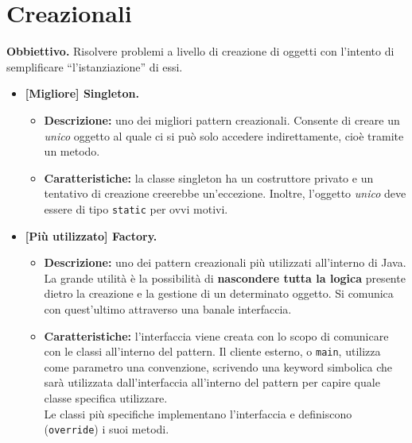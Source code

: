 \documentclass[a4paper,11pt]{article}
\begin{document}
\section{Creazionali}
\textcolor{Mahogany}{\textbf{Obbiettivo.}} Risolvere problemi a livello di creazione di oggetti con l'intento di semplificare ``l'istanziazione'' di essi.
\begin{itemize}
	\item[\ding{42}] \textbf{[Migliore] Singleton.}
		\begin{itemize}
			\item \textbf{Descrizione:} uno dei migliori pattern creazionali. Consente di creare un \emph{unico} oggetto al quale ci si può solo accedere indirettamente, cioè tramite un metodo.
			\item \textbf{Caratteristiche:} la classe singleton ha un costruttore privato e un tentativo di creazione creerebbe un'eccezione. Inoltre, l'oggetto \emph{unico} deve essere di tipo \texttt{static} per ovvi motivi.
		\end{itemize}
	
	\item[\ding{42}]  \textbf{[Più utilizzato] Factory.}
		\begin{itemize}
			\item \textbf{Descrizione:} uno dei pattern creazionali più utilizzati all'interno di Java. La grande utilità è la possibilità di  \textbf{nascondere tutta la logica} presente dietro la creazione e la gestione di un determinato oggetto. Si comunica con quest'ultimo attraverso una banale interfaccia.
			\item \textbf{Caratteristiche:} l'interfaccia viene creata con lo scopo di comunicare con le classi all'interno del pattern. Il cliente esterno, o \texttt{main}, utilizza come parametro una convenzione, scrivendo una keyword simbolica che sarà utilizzata dall'interfaccia all'interno del pattern per capire quale classe specifica utilizzare.\\
			Le classi più specifiche implementano l'interfaccia e definiscono (\texttt{override}) i suoi metodi.
		\end{itemize}
	
\newpage


\end{itemize}
\end{document}
